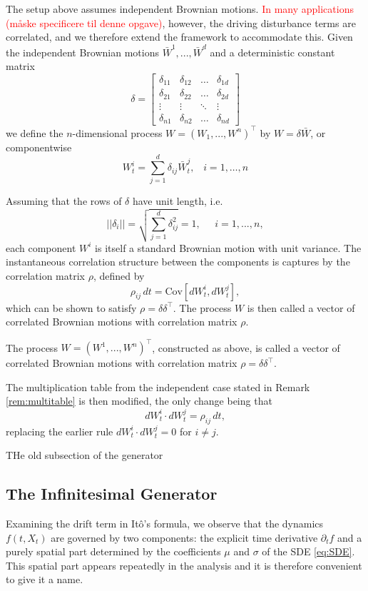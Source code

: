 The setup above assumes independent Brownian motions. \textcolor{red}{In many applications (måske specificere til denne opgave)}, however, the driving disturbance terms are correlated, and we therefore extend the framework to accommodate this. Given the independent Brownian motions $\bar{W}^1,...,\bar{W}^d$ and a deterministic constant matrix
$$\delta = \begin{bmatrix}
\delta_{11} & \delta_{12} & \dots  & \delta_{1d} \\
\delta_{21} & \delta_{22} & \dots  & \delta_{2d} \\
\vdots      & \vdots      & \ddots & \vdots      \\
\delta_{n1} & \delta_{n2} & \dots  & \delta_{nd}
\end{bmatrix}$$
we define the $n$-dimensional process $W=(W_1,...,W^n)^\top$ by $W=\delta \bar{W}$, or componentwise
$$W_t^i=\sum_{j=1}^d \delta_{ij}\bar{W}_t^j,\;\;\;i=1,\dots,n$$

Assuming that the rows of $\delta$ have unit length, i.e.
$$||\delta_i||=\sqrt{\sum_{j=1}^d \delta_{ij}^2}=1,\;\;\;\;\;i=1,...,n,$$
each component $W^i$ is itself a standard Brownian motion with unit variance. The instantaneous correlation structure between the components is captures by the correlation matrix $\rho$, defined by
$$\rho_{ij}\,dt=\text{Cov}[dW_t^i,dW_t^j],$$
which can be shown to satisfy $\rho=\delta\delta^\top$. The process $W$ is then called a vector of correlated Brownian motions with correlation matrix $\rho$.


\begin{definition}
The process $W=(W^1,...,W^n)^\top$, constructed as above, is called a vector of correlated Brownian motions with correlation matrix $\rho=\delta\delta^\top$.
\end{definition}

The multiplication table from the independent case stated in Remark \ref{rem:multitable} is then modified, the only change being that
$$dW_t^i\cdot dW_t^j=\rho_{ij}\,dt,$$
replacing the earlier rule $dW_t^i\cdot dW_t^j=0$ for $i\neq j$.


THe old subsection of the generator

\subsection{The Infinitesimal Generator}


Examining the drift term in Itô's formula, we observe that the dynamics $f(t,X_t)$ are governed by two components: the explicit time derivative $\partial_t f$ and a purely spatial part determined by the coefficients $\mu$ and $\sigma$ of the SDE \eqref{eq:SDE}. This spatial part appears repeatedly in the analysis and it is therefore convenient to give it a name.

